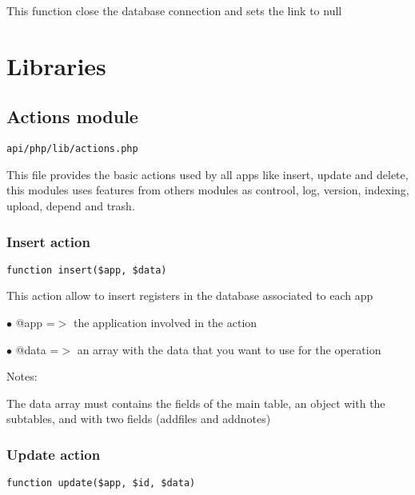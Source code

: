\documentclass[a4paper]{article}
\begin{document}
This function close the database connection and sets the link to null


\hypertarget{toc363}{}
\section{Libraries}

\hypertarget{toc364}{}
\subsection{Actions module}

\begin{lstlisting}
api/php/lib/actions.php
\end{lstlisting}

This file provides the basic actions used by all apps like insert,
update and delete, this modules uses features from others modules
as controol, log, version, indexing, upload, depend and trash.

\hypertarget{toc365}{}
\subsubsection{Insert action}

\begin{lstlisting}
function insert($app, $data)
\end{lstlisting}

This action allow to insert registers in the database associated to
each app

\begin{compactitem}
\item[\color{myblue}$\bullet$] @app  =$>$ the application involved in the action
\item[\color{myblue}$\bullet$] @data =$>$ an array with the data that you want to use for the operation
\end{compactitem}

Notes:

The data array must contains the fields of the main table, an object
with the subtables, and with two fields (addfiles and addnotes)

\hypertarget{toc366}{}
\subsubsection{Update action}

\begin{lstlisting}
function update($app, $id, $data)
\end{lstlisting}
\end{document}
